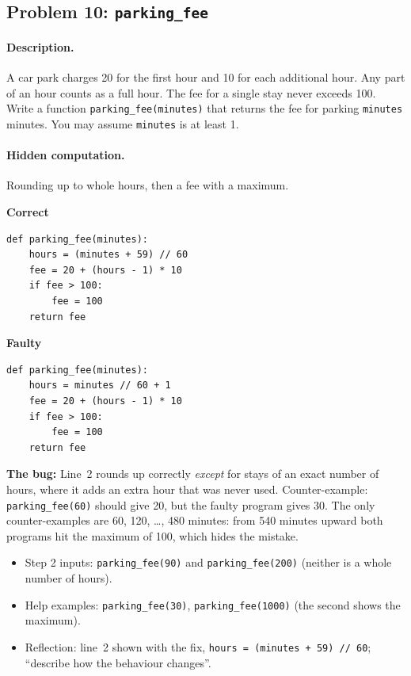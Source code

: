 \documentclass[11pt,a4paper]{article}
\newenvironment{codepair}{\par\noindent}{\par\medskip}
\newcommand{\codelabel}[1]{\textbf{\small #1}\par\vspace{2pt}}
\newcommand{\bugnote}[1]{\par\noindent\textcolor{bugred}{\textbf{The bug:}} #1\par\smallskip}
\begin{document}
\subsection{Problem 10: \texttt{parking\_fee}}

\paragraph{Description.} A car park charges 20 for the first hour and 10
for each additional hour. Any part of an hour counts as a full hour. The
fee for a single stay never exceeds 100. Write a function
\texttt{parking\_fee(minutes)} that returns the fee for parking
\texttt{minutes} minutes. You may assume \texttt{minutes} is at least 1.

\paragraph{Hidden computation.} Rounding up to whole hours, then a fee
with a maximum.

\begin{codepair}
\begin{minipage}[t]{0.48\textwidth}
\codelabel{Correct}
\begin{lstlisting}
def parking_fee(minutes):
    hours = (minutes + 59) // 60
    fee = 20 + (hours - 1) * 10
    if fee > 100:
        fee = 100
    return fee
\end{lstlisting}
\end{minipage}\hfill
\begin{minipage}[t]{0.48\textwidth}
\codelabel{Faulty}
\begin{lstlisting}
def parking_fee(minutes):
    hours = minutes // 60 + 1
    fee = 20 + (hours - 1) * 10
    if fee > 100:
        fee = 100
    return fee
\end{lstlisting}
\end{minipage}
\end{codepair}

\bugnote{Line~2 rounds up correctly \emph{except} for stays of an exact
number of hours, where it adds an extra hour that was never used.
Counter-example: \texttt{parking\_fee(60)} should give 20, but the faulty
program gives 30. The only counter-examples are 60, 120, \ldots, 480
minutes: from 540 minutes upward both programs hit the maximum of 100,
which hides the mistake.}

\begin{itemize}[nosep]
  \item Step 2 inputs: \texttt{parking\_fee(90)} and
        \texttt{parking\_fee(200)} (neither is a whole number of hours).
  \item Help examples: \texttt{parking\_fee(30)},
        \texttt{parking\_fee(1000)} (the second shows the maximum).
  \item Reflection: line~2 shown with the fix,
        \texttt{hours = (minutes + 59) // 60}; ``describe how the
        behaviour changes''.
\end{itemize}
\end{document}
